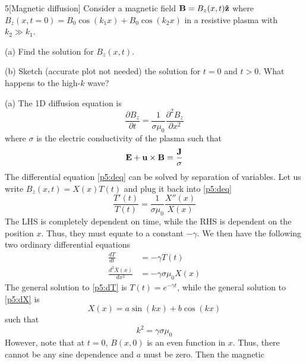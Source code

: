 \documentclass[12pt]{article}
\begin{document}
\begin{problem}{5}[Magnetic diffusion]
Consider a magnetic field $\vb{B}=B_z(x,t)\vb{\hat{z}}$ where
$B_z(x,t=0)=B_0\cos(k_1x)+B_0\cos(k_2x)$ in a resistive plasma with $k_2\gg
k_1$.

(a) Find the solution for $B_z(x,t)$.

(b) Sketch (accurate plot not needed) the solution for $t=0$ and $t>0$. What
happens to the high-$k$ wave?
\begin{solution}

    (a)
    The 1D diffusion equation is
    \begin{equation}\label{p5:deq}
        \frac{\partial B_z}{\partial
        t}=\frac1{\sigma\mu_0}\frac{\partial^2B_z}{\partial x^2} 
    \end{equation}
    where $\sigma$ is the electric conductivity of the plasma such that
    \begin{equation}
        \vb{E}+\vb{u}\times\vb{B}=\frac{\vb{J}}{\sigma} 
    \end{equation}
    The differential equation \eqref{p5:deq} can be solved by separation of
    variables. Let us write $B_z(x,t)=X(x)T(t)$ and plug it back into
    \eqref{p5:deq}
    \begin{equation}
        \frac{T'(t)}{T(t)}=\frac1{\sigma\mu_0}\frac{X''(x)}{X(x)}
    \end{equation}
    The LHS is completely dependent on time, while the RHS is dependent on the
    position $x$. Thus, they must equate to a constant $-\gamma$. We then have
    the following two ordinary differential equations
    \begin{subequations}
        \begin{align}
            \frac{dT}{dt}&=-\gamma T(t) \label{p5:dT}\\
            \frac{d^2X(x)}{dx^2}&=-\gamma\sigma\mu_0X(x)\label{p5:dX}
        \end{align} 
    \end{subequations}
    The general solution to \eqref{p5:dT} is $T(t)=e^{-\gamma t}$, while the
    general solution to \eqref{p5:dX} is
    \begin{equation}
        X(x)=a\sin(kx)+b\cos(kx) 
    \end{equation}
    such that
    \begin{equation}\label{p5:kgamma}
        k^2=\gamma\sigma\mu_0 
    \end{equation}
    However, note that at $t=0$, $B(x,0)$ is an even function in $x$. Thus, 
    there cannot be any sine dependence and $a$ must be zero. Then the magnetic 

\end{solution}
\end{problem}
\end{document}
